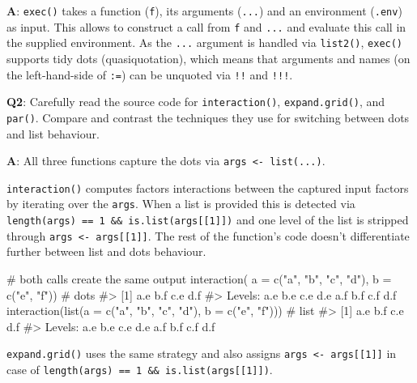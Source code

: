 \documentclass[
]{krantz}
\makeatletter
\newenvironment{Shaded}{\begin{snugshade}}{\end{snugshade}}
\newcommand{\CommentTok}[1]{\textcolor[rgb]{0.56,0.35,0.01}{\textit{#1}}}
\newcommand{\DataTypeTok}[1]{\textcolor[rgb]{0.13,0.29,0.53}{#1}}
\newcommand{\KeywordTok}[1]{\textcolor[rgb]{0.13,0.29,0.53}{\textbf{#1}}}
\newcommand{\NormalTok}[1]{#1}
\newcommand{\StringTok}[1]{\textcolor[rgb]{0.31,0.60,0.02}{#1}}
\newenvironment{kframe}{%
\medskip{}
\setlength{\fboxsep}{.8em}
 \def\at@end@of@kframe{}%
 \ifinner\ifhmode%
  \def\at@end@of@kframe{\end{minipage}}%
  \begin{minipage}{\columnwidth}%
 \fi\fi%
 \def\FrameCommand##1{\hskip\@totalleftmargin \hskip-\fboxsep
 \colorbox{shadecolor}{##1}\hskip-\fboxsep
     \hskip-\linewidth \hskip-\@totalleftmargin \hskip\columnwidth}%
 \MakeFramed {\advance\hsize-\width
   \@totalleftmargin\z@ \linewidth\hsize
   \@setminipage}}%
 {\par\unskip\endMakeFramed%
 \at@end@of@kframe}
\renewenvironment{Shaded}{\begin{kframe}}{\end{kframe}}
\renewcommand{\KeywordTok} [1]{\textcolor[rgb]{0.00,0.44,0.13}{{#1}}}
\renewcommand{\DataTypeTok}[1]{\textcolor[rgb]{0.56,0.13,0.00}{{#1}}}
\renewcommand{\StringTok}  [1]{\textcolor[rgb]{0.25,0.44,0.63}{{#1}}}
\renewcommand{\CommentTok} [1]{\textcolor[rgb]{0.38,0.63,0.69}{{#1}}}
\renewcommand{\NormalTok}  [1]{{#1}}
\makeatother
\begin{document}
\textbf{{A}}: \texttt{exec()} takes a function (\texttt{f}), its arguments (\texttt{...}) and an environment (\texttt{.env}) as input. This allows to construct a call from \texttt{f} and \texttt{...} and evaluate this call in the supplied environment. As the \texttt{...} argument is handled via \texttt{list2()}, \texttt{exec()} supports tidy dots (quasiquotation), which means that arguments and names (on the left-hand-side of \texttt{:=}) can be unquoted via \texttt{!!} and \texttt{!!!}.

\textbf{{Q2}}: Carefully read the source code for \texttt{interaction()}, \texttt{expand.grid()}, and \texttt{par()}. Compare and contrast the techniques they use for switching between dots and list behaviour.

\textbf{{A}}: All three functions capture the dots via \texttt{args\ \textless{}-\ list(...)}.

\texttt{interaction()} computes factors interactions between the captured input factors by iterating over the \texttt{args}. When a list is provided this is detected via \texttt{length(args)\ ==\ 1\ \&\&\ is.list(args{[}{[}1{]}{]})} and one level of the list is stripped through \texttt{args\ \textless{}-\ args{[}{[}1{]}{]}}. The rest of the function's code doesn't differentiate further between list and dots behaviour.

\begin{Shaded}
\begin{Highlighting}[]
\CommentTok{# both calls create the same output}
\KeywordTok{interaction}\NormalTok{(     }\DataTypeTok{a =} \KeywordTok{c}\NormalTok{(}\StringTok{"a"}\NormalTok{, }\StringTok{"b"}\NormalTok{, }\StringTok{"c"}\NormalTok{, }\StringTok{"d"}\NormalTok{), }\DataTypeTok{b =} \KeywordTok{c}\NormalTok{(}\StringTok{"e"}\NormalTok{, }\StringTok{"f"}\NormalTok{))   }\CommentTok{# dots}
\CommentTok{#> [1] a.e b.f c.e d.f}
\CommentTok{#> Levels: a.e b.e c.e d.e a.f b.f c.f d.f}
\KeywordTok{interaction}\NormalTok{(}\KeywordTok{list}\NormalTok{(}\DataTypeTok{a =} \KeywordTok{c}\NormalTok{(}\StringTok{"a"}\NormalTok{, }\StringTok{"b"}\NormalTok{, }\StringTok{"c"}\NormalTok{, }\StringTok{"d"}\NormalTok{), }\DataTypeTok{b =} \KeywordTok{c}\NormalTok{(}\StringTok{"e"}\NormalTok{, }\StringTok{"f"}\NormalTok{)))  }\CommentTok{# list}
\CommentTok{#> [1] a.e b.f c.e d.f}
\CommentTok{#> Levels: a.e b.e c.e d.e a.f b.f c.f d.f}
\end{Highlighting}
\end{Shaded}

\texttt{expand.grid()} uses the same strategy and also assigns \texttt{args\ \textless{}-\ args{[}{[}1{]}{]}} in case of \texttt{length(args)\ ==\ 1\ \&\&\ is.list(args{[}{[}1{]}{]})}.
\end{document}
